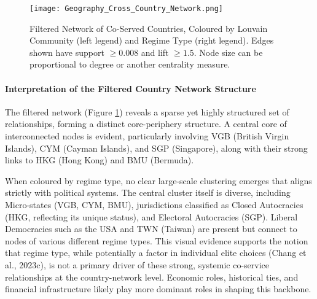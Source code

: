 \begin{figure}[htbp]
    \centering
    \texttt{[image: Geography\_Cross\_Country\_Network.png]}
    \caption{Filtered Network of Co-Served Countries, Coloured by Louvain Community (left legend) and Regime Type (right legend). Edges shown have support $\ge 0.008$ and lift $\ge 1.5$. Node size can be proportional to degree or another centrality measure.}
    \label{fig:geography_cross_country_network}
\end{figure}

\paragraph{Interpretation of the Filtered Country Network Structure}
The filtered network (Figure \ref{fig:geography_cross_country_network}) reveals a sparse yet highly structured set of relationships, forming a distinct core-periphery structure. A central core of interconnected nodes is evident, particularly involving VGB (British Virgin Islands), CYM (Cayman Islands), and SGP (Singapore), along with their strong links to HKG (Hong Kong) and BMU (Bermuda).

When coloured by regime type, no clear large-scale clustering emerges that aligns strictly with political systems. The central cluster itself is diverse, including Micro-states (VGB, CYM, BMU), jurisdictions classified as Closed Autocracies (HKG, reflecting its unique status), and Electoral Autocracies (SGP). Liberal Democracies such as the USA and TWN (Taiwan) are present but connect to nodes of various different regime types. This visual evidence supports the notion that regime type, while potentially a factor in individual elite choices (Chang et al., 2023c), is not a primary driver of these strong, systemic co-service relationships at the country-network level. Economic roles, historical ties, and financial infrastructure likely play more dominant roles in shaping this backbone.


